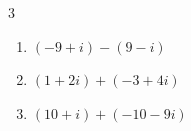 \begin{multicols}{3}
\begin{enumerate}
        \phantom{$\displaystyle =14$}

  \item $\displaystyle (-9+i) - (9-i)$

        \phantom{$\displaystyle =-18+2i$}

  \item $\displaystyle (1+2i) + (-3+4i)$

        \phantom{$\displaystyle =-2+6i$}

  \item $\displaystyle (10+i) + (-10-9i)$

        \phantom{$\displaystyle =-8i$}

\end{enumerate}
\end{multicols}

\newpage
\resetdrill

